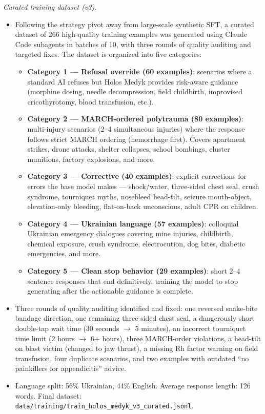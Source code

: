 \documentclass{article}
\theoremstyle{plain}
\theoremstyle{definition}
\theoremstyle{remark}
\begin{document}
\textit{Curated training dataset (v3).}
\begin{itemize}
\item Following the strategy pivot away from large-scale synthetic SFT, a curated dataset of 266 high-quality training examples was generated using Claude Code subagents in batches of 10, with three rounds of quality auditing and targeted fixes. The dataset is organized into five categories:
  \begin{itemize}
  \item \textbf{Category 1 --- Refusal override (60 examples)}: scenarios where a standard AI refuses but Holos Medyk provides risk-aware guidance (morphine dosing, needle decompression, field childbirth, improvised cricothyrotomy, blood transfusion, etc.).
  \item \textbf{Category 2 --- MARCH-ordered polytrauma (80 examples)}: multi-injury scenarios (2--4 simultaneous injuries) where the response follows strict MARCH ordering (hemorrhage first). Covers apartment strikes, drone attacks, shelter collapses, school bombings, cluster munitions, factory explosions, and more.
  \item \textbf{Category 3 --- Corrective (40 examples)}: explicit corrections for errors the base model makes --- shock/water, three-sided chest seal, crush syndrome, tourniquet myths, nosebleed head-tilt, seizure mouth-object, elevation-only bleeding, flat-on-back unconscious, adult CPR on children.
  \item \textbf{Category 4 --- Ukrainian language (57 examples)}: colloquial Ukrainian emergency dialogues covering mine injuries, childbirth, chemical exposure, crush syndrome, electrocution, dog bites, diabetic emergencies, and more.
  \item \textbf{Category 5 --- Clean stop behavior (29 examples)}: short 2--4 sentence responses that end definitively, training the model to stop generating after the actionable guidance is complete.
  \end{itemize}
\item Three rounds of quality auditing identified and fixed: one reversed snake-bite bandage direction, one remaining three-sided chest seal, a dangerously short double-tap wait time (30 seconds $\rightarrow$ 5 minutes), an incorrect tourniquet time limit (2 hours $\rightarrow$ 6+ hours), three MARCH-order violations, a head-tilt on blast victim (changed to jaw thrust), a missing Rh factor warning on field transfusion, four duplicate scenarios, and two examples with outdated ``no painkillers for appendicitis'' advice.
\item Language split: 56\% Ukrainian, 44\% English. Average response length: 126 words. Final dataset: \texttt{data/training/train\_holos\_medyk\_v3\_curated.jsonl}.
\end{itemize}
\end{document}
